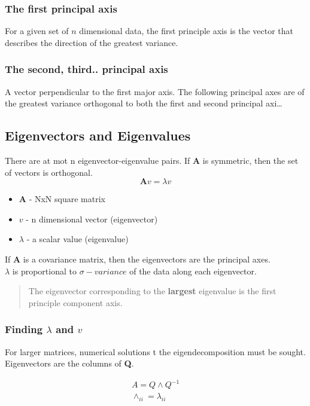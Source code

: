 \subsubsection{The first principal axis}
For a given set of $n$ dimensional data, the first principle axis  is the vector that describes the direction of the greatest variance.

\subsubsection{The second, third.. principal axis}
A vector perpendicular to the first major axis. The following principal axes are of the greatest variance orthogonal to both the first and second principal axi\dots

\subsection{Eigenvectors and Eigenvalues}
There are at mot n eigenvector-eigenvalue pairs. If \textbf{A} is symmetric, then the set of vectors is orthogonal.
\begin{equation}
    \textbf{A}v = \lambda v
\end{equation}

\begin{itemize}
    \item \textbf{A} - NxN square matrix
    \item $v$ - n dimensional vector (eigenvector)
    \item $\lambda$ - a scalar value (eigenvalue)
\end{itemize}

If \textbf{A} is a covariance matrix, then the eigenvectors are the principal axes. 
\\
\noindent $\lambda$ is proportional to $\sigma - variance$ of the data along each eigenvector.

\begin{quote}
    The eigenvector corresponding to the \textbf{largest} eigenvalue is the first principle component axis.
\end{quote}

\subsubsection{Finding $\lambda$ and $v$}
For larger matrices, numerical solutions t the eigendecomposition must be sought. Eigenvectors are the columns of \textbf{Q}.

\begin{align}
    A = Q \land Q^{-1} \\
    \land_{ii} = \lambda_{ii}
\end{align}

